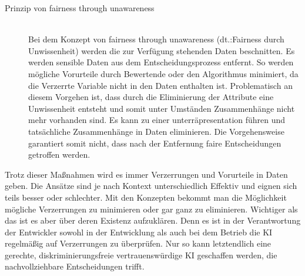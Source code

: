 \begin{onehalfspace}
\begin{description}
\begin{description}
                \item[Prinzip von \glqq{}fairness through unawareness\grqq{}] \hfill \\
                Bei dem Konzept von \glqq{}fairness through unawareness\grqq{} (\ac*{dt}.:Fairness durch Unwissenheit) werden die zur Verfügung stehenden Daten beschnitten. Es werden sensible Daten aus dem Entscheidungsprozess entfernt. So werden mögliche Vorurteile durch Bewertende oder den Algorithmus minimiert, da die Verzerrte Variable nicht in den Daten enthalten ist. Problematisch an diesem Vorgehen ist, dass durch die Eliminierung der Attribute eine Unwissenheit entsteht und somit unter Umständen Zusammenhänge nicht mehr vorhanden sind. Es kann zu einer unterräpresentation führen und tatsächliche Zusammenhänge in Daten eliminieren. Die Vorgehensweise garantiert somit nicht, dass nach der Entfernung faire Entscheidungen getroffen werden.\cite{hagendorff2019maschinelles}

            \end{description}
            
        \end{description}
        Trotz dieser Maßnahmen wird es immer Verzerrungen und Vorurteile in Daten geben. Die Ansätze sind je nach Kontext unterschiedlich Effektiv und eignen sich teils besser oder schlechter. Mit den Konzepten bekommt man die Möglichkeit mögliche Verzerrungen zu minimieren oder gar ganz zu eliminieren. Wichtiger als das ist es aber über deren Existenz aufzuklären. Denn es ist in der Verantwortung der Entwickler sowohl in der Entwicklung als auch bei dem Betrieb die \ac*{KI} regelmäßig auf Verzerrungen zu überprüfen.\cite{Drew2019} Nur so kann letztendlich eine gerechte, diskriminierungsfreie vertrauenswürdige \ac*{KI} geschaffen werden, die nachvollziehbare Entscheidungen trifft.\cite{HEGKI2019}\cite{HEGKI2019Definition}\cite{Fabi2020}
        
    \newpage
\end{onehalfspace}